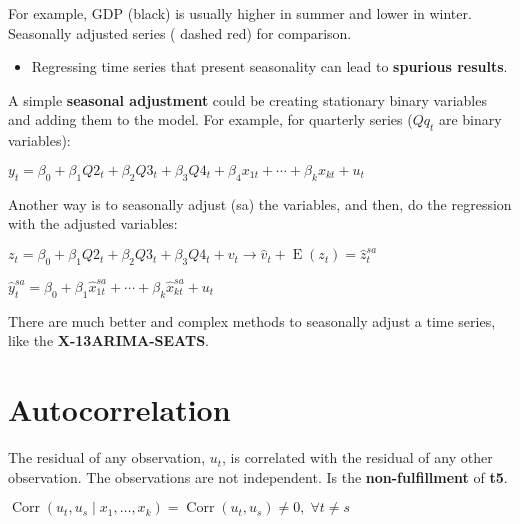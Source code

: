 \documentclass[10pt, a4paper, landscape]{article}
\DeclareMathOperator{\E}{E}
\DeclareMathOperator{\Corr}{Corr}
\begin{document}
\begin{multicols}{3}
\begin{multicols}{2}
\end{multicols}

For example, GDP (black) is usually higher in summer and lower in winter. Seasonally adjusted series ({\color{red} dashed red}) for comparison.

\begin{itemize}[leftmargin=*]
	\item Regressing time series that present seasonality can lead to \textbf{spurious results}.
\end{itemize}

A simple \textbf{seasonal adjustment} could be creating stationary binary variables and adding them to the model. For example, for quarterly series (\( Q q_{t} \) are binary variables):

\begin{center}
	\( y_{t} = \beta_{0} + \beta_{1} Q2_{t} + \beta_{2} Q3_{t} + \beta_{3} Q4_{t} + \beta_{4} x_{1t} + \cdots + \beta_{k} x_{kt} + u_{t} \)
\end{center}

Another way is to seasonally adjust (sa) the variables, and then, do the regression with the adjusted variables:

\begin{center}
	\( z_{t} = \beta_{0} + \beta_{1} Q2_{t} + \beta_{2} Q3_{t} + \beta_{3} Q4_{t} + v_{t} \rightarrow \hat{v}_{t} + \E(z_{t}) = \hat{z}_{t}^{sa} \)

	\( \hat{y}_{t}^{sa} = \beta_{0} + \beta_{1} \hat{x}_{1t}^{sa} + \cdots + \beta_{k} \hat{x}_{kt}^{sa} + u_{t} \)
\end{center}

There are much better and complex methods to seasonally adjust a time series, like the \textbf{X-13ARIMA-SEATS}.

\columnbreak

\section*{Autocorrelation}

The residual of any observation, \( u_{t} \), is correlated with the residual of any other observation. The observations are not independent. Is the \textbf{non-fulfillment} of \textbf{t5}.

\begin{center}
	\( \Corr(u_{t}, u_{s} \mid x_{1}, \ldots, x_{k}) = \Corr(u_{t}, u_{s}) \neq 0, \; \forall t \neq s \)
\end{center}


\end{multicols}
\end{document}
